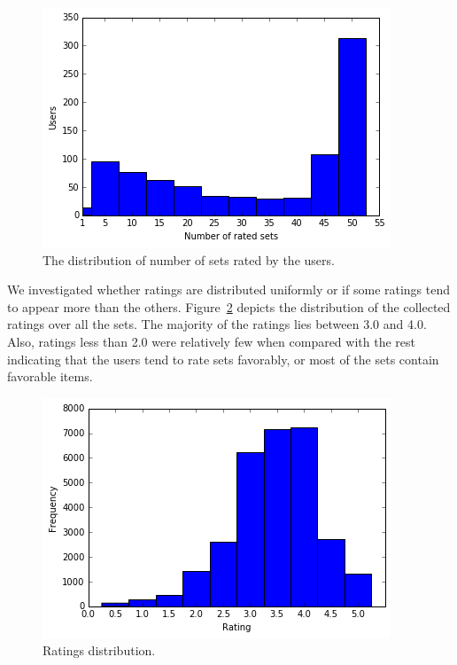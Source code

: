 \begin{figure}[ht]
  \includegraphics[scale=0.65]{figures/usersetdist.png}
  \caption{The distribution of number of sets rated by the users.}
  \label{fig:usersetdist}
\end{figure}

We investigated whether ratings are distributed uniformly or if some ratings
tend to appear more than the others.
Figure~\ref{fig:setratingdist} depicts
the distribution of the collected ratings over all the sets. 
The majority of the ratings lies between 3.0 and 4.0. Also, ratings less than
2.0 were relatively few when compared with the rest indicating that the users
tend to rate sets favorably, or most of the sets contain favorable items. 


\begin{figure}[ht]
  \includegraphics[scale=0.65]{figures/setratingdist.png}
  \caption{Ratings distribution.}
  \label{fig:setratingdist}
\end{figure}





